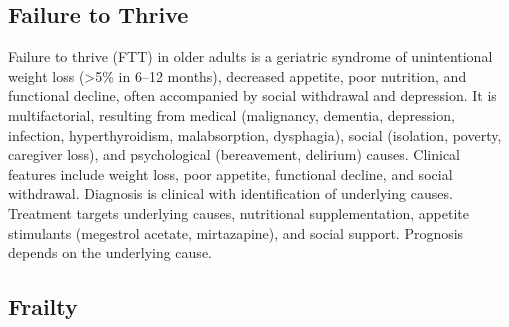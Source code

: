 






\label{sec:Frailty and Geriatric Syndromes}

\subsection{Failure to Thrive}
\label{sec:Failure to Thrive}

Failure to thrive (FTT) in older adults is a geriatric syndrome of unintentional weight loss (>5\% in 6--12 months), decreased appetite, poor nutrition, and functional decline, often accompanied by social withdrawal and depression. It is multifactorial, resulting from medical (malignancy, dementia, depression, infection, hyperthyroidism, malabsorption, dysphagia), social (isolation, poverty, caregiver loss), and psychological (bereavement, delirium) causes. Clinical features include weight loss, poor appetite, functional decline, and social withdrawal. Diagnosis is clinical with identification of underlying causes. Treatment targets underlying causes, nutritional supplementation, appetite stimulants (megestrol acetate, mirtazapine), and social support. Prognosis depends on the underlying cause.

\subsection{Frailty}
\label{sec:Frailty}

